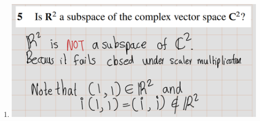 \documentclass[
]{book}
\theoremstyle{definition}
\theoremstyle{definition}
\theoremstyle{definition}
\theoremstyle{definition}
\theoremstyle{remark}
\begin{document}
\begin{enumerate}
\item
  \hfill\break
  \includegraphics{fig/Ex1C/Ex5.png}
\end{enumerate}

  
\end{document}
